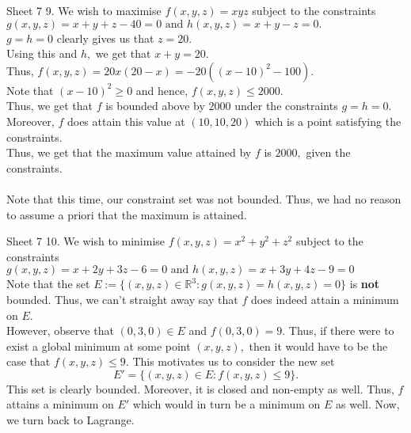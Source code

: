 \documentclass[handout, aspectratio=169]{beamer}
\begin{document}
\begin{frame}{Sheet 7}
	9. We wish to maximise $f(x, y, z)=x y z$ subject to the constraints $g(x, y, z) = x+y+z - 40 = 0 \text { and } h(x, y, z) = x+y - z = 0.$\\
	$g = h = 0$ clearly gives us that $z = 20.$\\
	Using this and $h,$ we get that $x + y = 20.$\\
	Thus, $f(x, y, z) = 20x(20 - x) = -20\left((x-10)^2 - 100\right).$\\
	Note that $(x-10)^2\ge0$ and hence, $f(x, y, z) \le 2000.$\\
	Thus, we get that $f$ is bounded above by $2000$ under the constraints $g=h=0.$\\
	Moreover, $f$ does attain this value at $(10, 10, 20)$ which is a point satisfying the constraints.\\
	Thus, we get that the maximum value attained by $f$ is $2000,$ given the constraints.\\~\\
	Note that this time, our constraint set was not bounded. Thus, we had no reason to assume a priori that the maximum is attained.
\end{frame}
\begin{frame}{Sheet 7}
	10. We wish to minimise $f(x, y, z)=x^2 + y^2 + z^2$ subject to the constraints $g(x, y, z) = x+2 y+3 z - 6=0 \text { and }  h(x, y, z) = x+3 y+4 z - 9= 0$\\
	Note that the set $E := \{(x, y, z) \in \mathbb{R}^3 : g(x, y, z) = h(x, y, z) = 0\}$ is \textbf{not} bounded. Thus, we can't straight away say that $f$ does indeed attain a minimum on $E.$\\
	However, observe that $(0, 3, 0) \in E$ and $f(0, 3, 0) = 9.$ Thus, if there were to exist a global minimum at some point $(x, y, z),$ then it would have to be the case that $f(x, y, z) \le 9.$ This motivates us to consider the new set
	\[E' = \{(x, y, z) \in E: f(x, y, z) \le 9\}.\]
	This set is clearly bounded. Moreover, it is closed and non-empty as well. Thus, $f$ attains a minimum on $E'$ which would in turn be a minimum on $E$ as well. Now, we turn back to Lagrange.
\end{frame}
	
\end{document}
